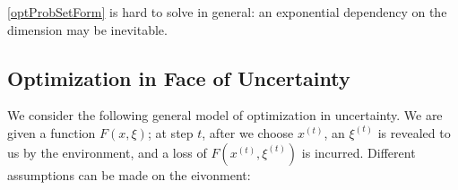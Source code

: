\documentclass[openany]{book}
\newtheorem{theorem}{Theorem}[chapter]
\theoremstyle{definition}
\theoremstyle{remark}
\begin{document}
\eqref{optProbSetForm} is hard to solve in general: an exponential dependency on the dimension may be inevitable.
\begin{comment}
For instance, consider the following problem:
\begin{equation}\label{unitBoxMin}
    \min_{x\in[0,1]^n}f(x),
\end{equation}
where $f$ is $\lambda$-Lipschitz continuous over $[0,1]^n$. We want to find an $\epsilon$-additive approximate solution.

One can use the uniform grid method: Divide each dimension into $\lceil\frac{\lambda\sqrt{n}}{2\epsilon}\rceil$ uniform intervals, and consider all grid points. We can get an $\epsilon$-approximate solution with a query complexity of $(\lceil\frac{\lambda\sqrt{n}}{2\epsilon}\rceil+1)^n$. What's more, such a query complexity is necessary.

\begin{theorem}
    The query complexity of problem \eqref{unitBoxMin} with a zeroth order oracle is at least $(\lceil \frac{\lambda}{2\epsilon}\rceil-1)^n$.
\end{theorem}
\begin{proof}
    Divide each dimension into $\lceil \frac{\lambda}{2\epsilon}\rceil-1$ uniform intervals. For each query $x$, return $f(x)=0$. Then the algorithm will conclude the minimum is $0$. However, if the query complexity is less than $(\lceil \frac{\lambda}{2\epsilon}\rceil-1)^n$, then there will be one cube $\prod_{i=1}^n[a_i,b_i]$ whose vertices are grid points and no interior point of this cube is queried. We can then set $f(x)=\min_{1\le i\le n}\min\{\lambda(x_i-a_i),\lambda(b_i-x_i)\}$ on $\prod_{i=1}^n[a_i,b_i]$ and $0$ everywhere else. One can check that $f$ is $\lambda$-Lipschitz continuous over $[0,1]^n$ but the optimum value is $(\frac{\lambda}{2})/(\lceil \frac{\lambda}{2\epsilon}\rceil-1)>\epsilon$.
\end{proof}

In economics, and specifically monotone comparative statics, the following parameterized optimization problem is often considered:
\begin{equation}
    \min_{x\in C_t}f(x).
\end{equation}
Here $t\in T$ is a parameter. Monotone comparative statics are interested especially in cases when the optimal solution is a monotone function of $t$.
\end{comment}

\subsection{Optimization in Face of Uncertainty}
We consider the following general model of optimization in uncertainty. We are given a function $F(x,\xi)$; at step $t$, after we choose $x^{(t)}$, an $\xi^{(t)}$ is revealed to us by the environment, and a loss of $F(x^{(t)},\xi^{(t)})$ is incurred. Different assumptions can be made on the eivonment:
\end{document}
